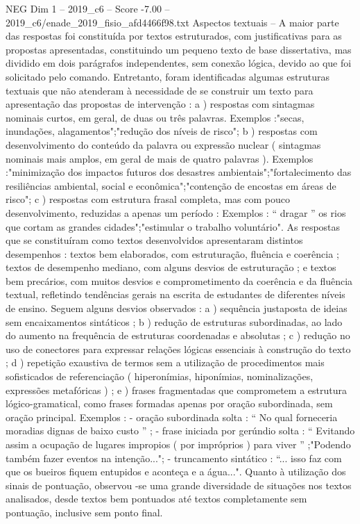 \begin{textsample}{NEG Dim 1 – 2019\_c6 – Score -7.00 – 2019\_c6/enade\_2019\_fisio\_afd4466f98.txt}
Aspectos textuais – A maior parte das respostas foi constituída por textos estruturados, com justificativas para as propostas apresentadas, constituindo um pequeno texto de base dissertativa, mas dividido em dois parágrafos independentes, sem conexão lógica, devido ao que foi solicitado pelo comando.
Entretanto, foram identificadas algumas estruturas textuais que não atenderam à necessidade de se construir um texto para apresentação das propostas de intervenção : a ) respostas com sintagmas nominais curtos, em geral, de duas ou três palavras.
Exemplos :"secas, inundações, alagamentos";"redução dos níveis de risco"; b ) respostas com desenvolvimento do conteúdo da palavra ou expressão nuclear ( sintagmas nominais mais amplos, em geral de mais de quatro palavras ).
Exemplos :"minimização dos impactos futuros dos desastres ambientais";"fortalecimento das resiliências ambiental, social e econômica";"contenção de encostas em áreas de risco"; c ) respostas com estrutura frasal completa, mas com pouco desenvolvimento, reduzidas a apenas um período : Exemplos : “ dragar ” os rios que cortam as grandes cidades";"estimular o trabalho voluntário".
As respostas que se constituíram como textos desenvolvidos apresentaram distintos desempenhos : textos bem elaborados, com estruturação, fluência e coerência ; textos de desempenho mediano, com alguns desvios de estruturação ; e textos bem precários, com muitos desvios e comprometimento da coerência e da fluência textual, refletindo tendências gerais na escrita de estudantes de diferentes níveis de ensino.
Seguem alguns desvios observados : a ) sequência justaposta de ideias sem encaixamentos sintáticos ; b ) redução de estruturas subordinadas, ao lado do aumento na frequência de estruturas coordenadas e absolutas ; c ) redução no uso de conectores para expressar relações lógicas essenciais à construção do texto ; d ) repetição exaustiva de termos sem a utilização de procedimentos mais sofisticados de referenciação ( hiperonímias, hiponímias, nominalizações, expressões metafóricas ) ; e ) frases fragmentadas que comprometem a estrutura lógico-gramatical, como frases formadas apenas por oração subordinada, sem oração principal.
Exemplos : - oração subordinada solta : “ No qual forneceria moradias dignas de baixo custo ” ; - frase iniciada por gerúndio solta : “ Evitando assim a ocupação de lugares impropios ( por impróprios ) para viver ” ;"Podendo também fazer eventos na intenção..."; - truncamento sintático : “... isso faz com que os bueiros fiquem entupidos e aconteça e a água...".
Quanto à utilização dos sinais de pontuação, observou -se uma grande diversidade de situações nos textos analisados, desde textos bem pontuados até textos completamente sem pontuação, inclusive sem ponto final.

\end{textsample}

